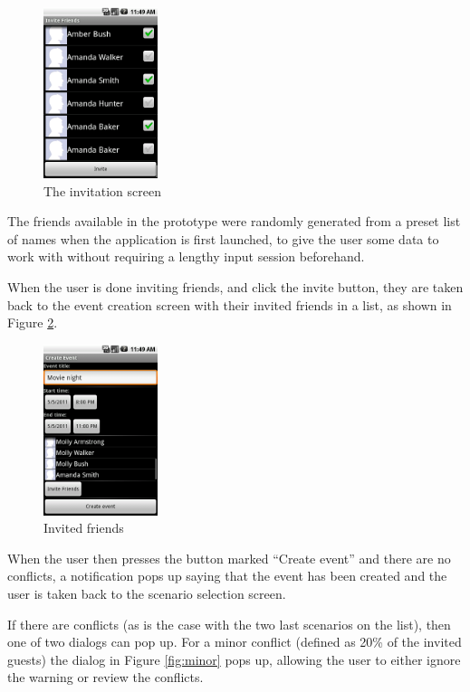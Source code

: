 \documentclass[a4paper,11pt]{report}
\begin{document}
\begin{figure}[htb]
  \centering
  \includegraphics[height=50mm]{invitation}
  \caption{The invitation screen}
  \label{fig:invitation}
\end{figure}

The friends available in the prototype were randomly generated from a preset
list of names when the application is first launched, to give the user some data
to work with without requiring a lengthy input session beforehand.

When the user is done inviting friends, and click the invite button, they are
taken back to the event creation screen with their invited friends in a list, as
shown in Figure \ref{fig:invited}.

\begin{figure}[htb]
  \centering
  \includegraphics[height=50mm]{invited}
  \caption{Invited friends}
  \label{fig:invited}
\end{figure}

When the user then presses the button marked ``Create event'' and there are no
conflicts, a notification pops up saying that the event has been created and the
user is taken back to the scenario selection screen.

If there are conflicts (as is the case with the two last scenarios on the list),
then one of two dialogs can pop up. For a minor conflict (defined as 20\% of the
invited guests) the dialog in Figure \ref{fig:minor} pops up, allowing the user
to either ignore the warning or review the conflicts.
\end{document}
